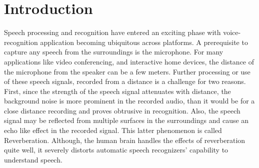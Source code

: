 
\chapter{Introduction} 




\ifpdf
    \graphicspath{{Chapter1/Figs/Raster/}{Chapter1/Figs/PDF/}{Chapter1/Figs/}}
\else
    \graphicspath{{Chapter1/Figs/Vector/}{Chapter1/Figs/}}
\fi


Speech processing and recognition have entered an exciting phase with voice-recognition application becoming ubiquitous across platforms. A prerequisite to capture any speech from the surroundings is the microphone. For many applications like video conferencing, and interactive home devices, the distance of the microphone from the speaker can be a few meters. Further processing or use of these speech signals, recorded from a distance is a challenge for two reasons. First, since the strength of the speech signal attenuates with distance, the background noise is more prominent in the recorded audio, than it would be for a close distance recording and proves obtrusive in recognition. Also, the speech signal may be reflected from multiple surfaces in the surroundings and cause an echo like effect in the recorded signal. This latter phenomenon is called Reverberation. Although, the human brain handles the effects of reverberation quite well, it severely distorts automatic speech recognizers’ capability to understand speech. \\

